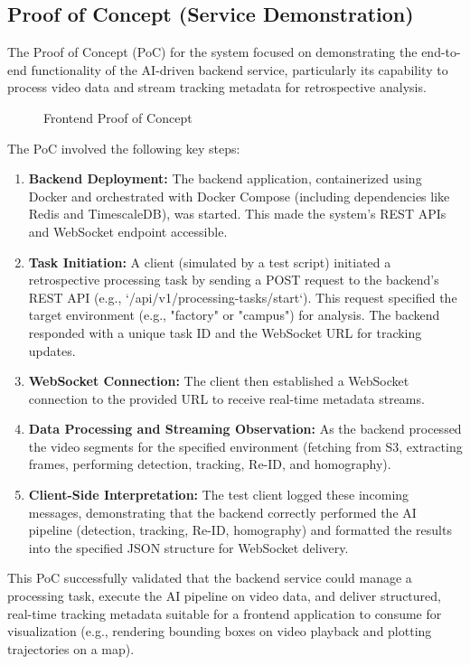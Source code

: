 \subsection{Proof of Concept (Service Demonstration)}
\label{subsection:poc_service_demo_new}
The Proof of Concept (PoC) for the \usevar{\srsTitle} system focused on demonstrating the end-to-end functionality of the AI-driven backend service, particularly its capability to process video data and stream tracking metadata for retrospective analysis.

\begin{figure}[!htb]
    \centering
    \caption{Frontend Proof of Concept}
    \label{fig:fontend_poc}
\end{figure}

The PoC involved the following key steps:

\begin{enumerate}
    \item \textbf{Backend Deployment:} The backend application, containerized using Docker and orchestrated with Docker Compose (including dependencies like Redis and TimescaleDB), was started. This made the system's REST APIs and WebSocket endpoint accessible.
    \item \textbf{Task Initiation:} A client (simulated by a test script) initiated a retrospective processing task by sending a POST request to the backend's REST API (e.g., `/api/v1/processing-tasks/start`). This request specified the target environment (e.g., "factory" or "campus") for analysis. The backend responded with a unique task ID and the WebSocket URL for tracking updates.
    \item \textbf{WebSocket Connection:} The client then established a WebSocket connection to the provided URL to receive real-time metadata streams.
    \item \textbf{Data Processing and Streaming Observation:} As the backend processed the video segments for the specified environment (fetching from S3, extracting frames, performing detection, tracking, Re-ID, and homography).
    \item \textbf{Client-Side Interpretation:} The test client logged these incoming messages, demonstrating that the backend correctly performed the AI pipeline (detection, tracking, Re-ID, homography) and formatted the results into the specified JSON structure for WebSocket delivery.
\end{enumerate}
This PoC successfully validated that the backend service could manage a processing task, execute the AI pipeline on video data, and deliver structured, real-time tracking metadata suitable for a frontend application to consume for visualization (e.g., rendering bounding boxes on video playback and plotting trajectories on a map).

